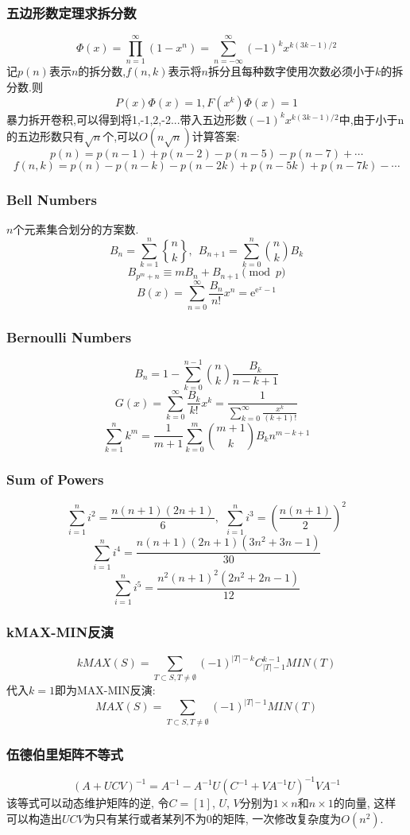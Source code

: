 \begin{small}
\subsubsection{五边形数定理求拆分数}
\[ \Phi(x) = \prod_{n=1}^{\infty}(1-x^n) = \sum_{n=-\infty}^{\infty}{(-1)^kx^{k(3k-1)/2}} \]
记$p(n)$表示$n$的拆分数,$f(n,k)$表示将$n$拆分且每种数字使用次数必须小于$k$的拆分数.则
\[ P(x)\Phi(x)=1, F(x^k)\Phi(x)=1\]
暴力拆开卷积,可以得到将1,-1,2,-2...带入五边形数$(-1)^kx^{k(3k-1)/2}$中,由于小于n的五边形数只有$\sqrt{n}$个,可以$O(n\sqrt{n})$计算答案:
\[ p(n) = p(n-1)+p(n-2)-p(n-5)-p(n-7)+\cdots \]
\[ f(n, k) = p(n)-p(n-k)-p(n-2k)+p(n-5k)+p(n-7k)-\cdots \]
\subsubsection{Bell Numbers}
$n$个元素集合划分的方案数.
\[ B_n=\sum_{k=1}^{n}{n\brace k},\ \ B_{n+1} = \sum_{k=0}^n{n \choose k}B_k \]
\[ B_{p^m+n} \equiv mB_n+B_{n+1} \pmod{p} \]
\[B(x)=\sum_{n=0}^{\infty}\frac{B_n}{n!}x^n=\mathrm{e}^{\mathrm{e}^x-1}\]
\subsubsection{Bernoulli Numbers}
\[ B_n = 1 - \sum_{k=0}^{n-1}{n \choose k}\frac{B_k}{n-k+1} \]
\[ G(x) = \sum_{k=0}^{\infty}\frac{B_k}{k!}x^k
= \frac{1}{\sum_{k=0}^{\infty}\frac{x^k}{(k+1)!}} \]
\[ \sum_{k=1}^nk^m = \frac{1}{m+1}\sum_{k=0}^m{m+1 \choose k}B_kn^{m-k+1} \]
\subsubsection{Sum of Powers}
\[\sum_{i=1}^ni^2=\frac{n(n+1)(2n+1)}{6},\ \ \sum_{i=1}^ni^3=(\frac{n(n+1)}{2})^2\]
\[\sum_{i=1}^ni^4=\frac{n(n+1)(2n+1)(3n^2+3n-1)}{30}\]
\[\sum_{i=1}^ni^5=\frac{n^2(n+1)^2(2n^2+2n-1)}{12}\]
\subsubsection{kMAX-MIN反演}
\[kMAX(S)=\sum_{T\subset S, T\neq \emptyset}(-1)^{|T|-k}C_{|T|-1}^{k-1}MIN(T)\]
代入$k=1$即为MAX-MIN反演:
\[MAX(S)=\sum_{T\subset S, T\neq \emptyset}(-1)^{|T|-1}MIN(T)\]
\subsubsection{伍德伯里矩阵不等式}
$$(A+UCV)^{-1}=A^{-1}-A^{-1}U(C^{-1}+VA^{-1}U)^{-1}VA^{-1}$$
该等式可以动态维护矩阵的逆, 令$C=[1]$, $U$, $V$分别为$1\times n$和$n\times 1$的向量, 这样可以构造出$UCV$为只有某行或者某列不为0的矩阵, 一次修改复杂度为$O(n^2)$.

\end{small}
